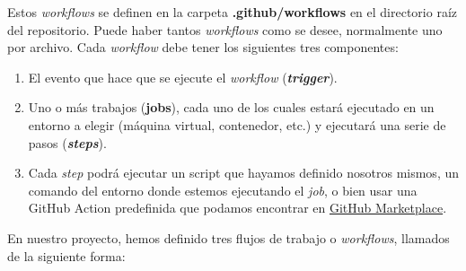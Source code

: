 Estos \textit{workflows} se definen en la carpeta \textbf{.github/workflows} en el directorio
raíz del repositorio. Puede haber tantos \textit{workflows} como se desee, normalmente uno
por archivo. Cada \textit{workflow} debe tener los siguientes tres componentes:

    \begin{enumerate}
        \item El evento que hace que se ejecute el \textit{workflow} (\textbf{\textit{trigger}}).
        \item Uno o más trabajos (\textbf{jobs}), cada uno de los cuales estará ejecutado en
        un entorno a elegir (máquina virtual, contenedor, etc.) y ejecutará una serie de
        pasos (\textbf{\textit{steps}}).
        \item Cada \textit{step} podrá ejecutar un script que hayamos definido nosotros
        mismos, un comando del entorno donde estemos ejecutando el \textit{job}, o bien usar
        una GitHub Action predefinida que podamos encontrar en
        \href{https://github.com/marketplace?type=actions}{GitHub Marketplace}.
    \end{enumerate}

En nuestro proyecto, hemos definido tres flujos de trabajo o \textit{workflows}, llamados
de la siguiente forma:

